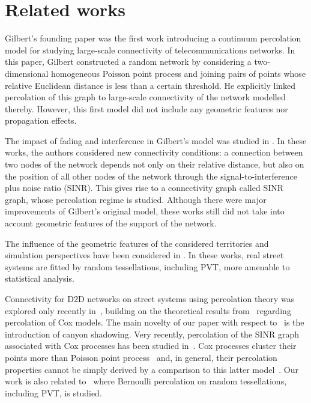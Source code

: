 \documentclass[conference]{IEEEtran}
\begin{document}
\section{Related works}
\label{s.RelatedWorks}
Gilbert's founding paper \cite{gilbert1961random} was the first work introducing a continuum percolation
model for studying large-scale connectivity of telecommunications networks. In this paper, Gilbert constructed a random network by considering a two-dimensional homogeneous Poisson point process and joining pairs of points whose relative Euclidean distance is less than a certain threshold. He explicitly linked percolation of this graph to large-scale connectivity of the network modelled thereby. However, this first model did not include any geometric features nor propagation effects.

The impact of fading and
interference in Gilbert's model was studied in \cite{dousse2005impact,dousse2006percolation}. In these works, the authors considered new connectivity conditions: a connection between two nodes of the network depends not only on their relative distance, but also on the position of all other nodes of the network through the signal-to-interference plus noise ratio (SINR). This gives rise to a connectivity graph called SINR graph, whose percolation regime is studied. Although there were major improvements of Gilbert's original model, these works still did not take into account geometric features of the support of the network.

The influence of the geometric features of the considered territories and simulation perspectives have been considered in \cite{gloaguen2006fitting, gloaguen2009parametric}. In these works, real street systems are fitted by random tessellations, including PVT, more amenable to statistical analysis.

Connectivity for D2D networks on street systems using percolation
theory was explored only recently in~\cite{cali2018percolation}, building on the theoretical results from~\cite{hirsch_continuum_2017}
regarding percolation of Cox models.   
The main novelty of our  paper with respect to~\cite{cali2018percolation} is the introduction of canyon shadowing.
Very recently, percolation  of  the  SINR  graph  associated with Cox processes has been studied in~\cite{SINR-Cox2018}.
Cox processes %
cluster their points more than Poisson point process~\cite{blaszczyszyn2014comparison}
and, in general, their percolation  properties cannot be simply derived by a comparison to this latter model~\cite{blaszczyszyn2013clustering}.
Our work is also related to~\cite{ziesche2016bernoulli} where Bernoulli percolation on random tessellations, including PVT, is studied.
\end{document}
